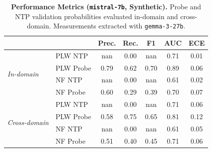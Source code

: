 \begin{table}[ht]
\centering
\begin{tabular}{ll ccccc}
\toprule
& & Prec. & Rec. & F1 & AUC & ECE \\
\midrule
\multirow{4}{*}{\textit{In-domain}}
& PLW NTP & nan & 0.00 & nan & 0.71 & 0.01 \\
& PLW Probe & 0.79 & 0.62 & 0.70 & 0.89 & 0.06 \\
& NF NTP & nan & 0.00 & nan & 0.61 & 0.02 \\
& NF Probe & 0.60 & 0.29 & 0.39 & 0.70 & 0.07 \\
\midrule
\multirow{4}{*}{\textit{Cross-domain}}
& PLW NTP & nan & 0.00 & nan & 0.71 & 0.06 \\
& PLW Probe & 0.58 & 0.75 & 0.65 & 0.81 & 0.12 \\
& NF NTP & nan & 0.00 & nan & 0.61 & 0.05 \\
& NF Probe & 0.51 & 0.40 & 0.45 & 0.71 & 0.06 \\
\bottomrule
\end{tabular}
\caption{\textbf{Performance Metrics (\texttt{mistral-7b}, Synthetic).} Probe and NTP validation probabilities evaluated in-domain and cross-domain. Measurements extracted with \texttt{gemma-3-27b}.}
\label{tab:mistral-7b-gemma-3-27b-head-syn}
\end{table}
